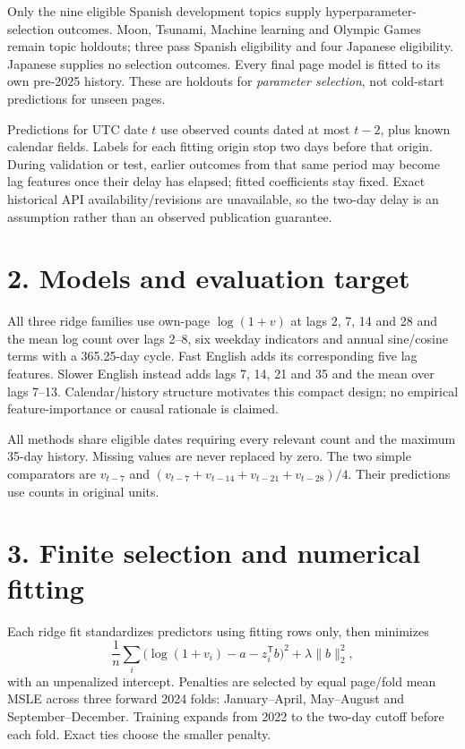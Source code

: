 \documentclass[11pt,letterpaper]{article}
\begin{document}
Only the nine eligible Spanish development topics supply hyperparameter-selection outcomes. Moon, Tsunami, Machine learning and Olympic Games remain topic holdouts; three pass Spanish eligibility and four Japanese eligibility. Japanese supplies no selection outcomes. Every final page model is fitted to its own pre-2025 history. These are holdouts for \emph{parameter selection}, not cold-start predictions for unseen pages.

Predictions for UTC date $t$ use observed counts dated at most $t-2$, plus known calendar fields. Labels for each fitting origin stop two days before that origin. During validation or test, earlier outcomes from that same period may become lag features once their delay has elapsed; fitted coefficients stay fixed. Exact historical API availability/revisions are unavailable, so the two-day delay is an assumption rather than an observed publication guarantee.

\section*{2. Models and evaluation target}
All three ridge families use own-page $\log(1+v)$ at lags 2, 7, 14 and 28 and the mean log count over lags 2--8, six weekday indicators and annual sine/cosine terms with a 365.25-day cycle. Fast English adds its corresponding five lag features. Slower English instead adds lags 7, 14, 21 and 35 and the mean over lags 7--13. Calendar/history structure motivates this compact design; no empirical feature-importance or causal rationale is claimed.

All methods share eligible dates requiring every relevant count and the maximum 35-day history. Missing values are never replaced by zero. The two simple comparators are $v_{t-7}$ and $(v_{t-7}+v_{t-14}+v_{t-21}+v_{t-28})/4$. Their predictions use counts in original units.

\newpage
\section*{3. Finite selection and numerical fitting}
Each ridge fit standardizes predictors using fitting rows only, then minimizes
\[
\frac{1}{n}\sum_i\bigl(\log(1+v_i)-a-z_i^\mathsf{T}b\bigr)^2+\lambda\lVert b\rVert_2^2,
\]
with an unpenalized intercept. Penalties are selected by equal page/fold mean MSLE across three forward 2024 folds: January--April, May--August and September--December. Training expands from 2022 to the two-day cutoff before each fold. Exact ties choose the smaller penalty.
\end{document}
